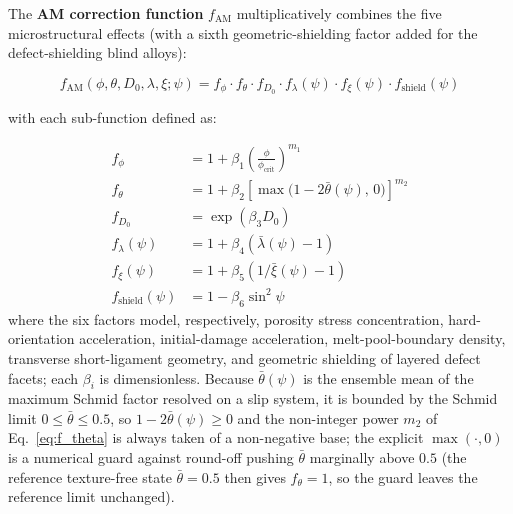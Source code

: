 The \textbf{AM correction function} $f_{\text{AM}}$ multiplicatively combines the five microstructural effects (with a sixth geometric-shielding factor added for the defect-shielding blind alloys):

\begin{equation}
f_{\text{AM}}(\phi, \theta, D_0, \lambda, \xi; \psi) = f_\phi \cdot f_\theta \cdot f_{D_0} \cdot f_\lambda(\psi) \cdot f_\xi(\psi) \cdot f_{\text{shield}}(\psi)
\label{eq:f_AM}
\end{equation}

with each sub-function defined as:

\begin{align}
f_\phi &= 1 + \beta_1 \left(\frac{\phi}{\phi_{\text{crit}}}\right)^{m_1} \label{eq:f_phi} \\
f_\theta &= 1 + \beta_2 \left[\max\!\big(1 - 2\bar{\theta}(\psi),\,0\big)\right]^{m_2} \label{eq:f_theta} \\
f_{D_0} &= \exp(\beta_3 D_0) \label{eq:f_D0} \\
f_\lambda(\psi) &= 1 + \beta_4 \left(\bar{\lambda}(\psi) - 1\right) \label{eq:f_lambda} \\
f_\xi(\psi) &= 1 + \beta_5 \left(1/\bar{\xi}(\psi) - 1\right) \label{eq:f_xi} \\
f_{\text{shield}}(\psi) &= 1 - \beta_6 \sin^2\psi \label{eq:f_shield}
\end{align}
where the six factors model, respectively, porosity stress concentration, hard-orientation acceleration, initial-damage acceleration, melt-pool-boundary density, transverse short-ligament geometry, and geometric shielding of layered defect facets; each $\beta_i$ is dimensionless. Because $\bar{\theta}(\psi)$ is the ensemble mean of the maximum Schmid factor resolved on a slip system, it is bounded by the Schmid limit $0 \le \bar{\theta} \le 0.5$, so $1 - 2\bar{\theta}(\psi) \ge 0$ and the non-integer power $m_2$ of Eq.~\eqref{eq:f_theta} is always taken of a non-negative base; the explicit $\max(\cdot,0)$ is a numerical guard against round-off pushing $\bar{\theta}$ marginally above $0.5$ (the reference texture-free state $\bar{\theta} = 0.5$ then gives $f_\theta = 1$, so the guard leaves the reference limit unchanged).


